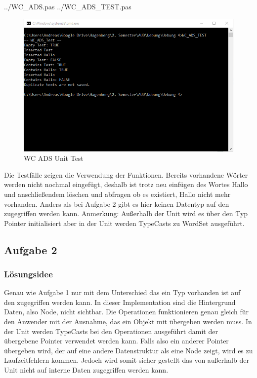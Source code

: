 \documentclass[a4papr,12pt]{article}
\begin{document}
 {../WC_ADS.pas}
 {../WC_ADS_TEST.pas}
\begin{figure}[H]
	\centering
	\includegraphics[scale=0.8]{./pictures/1.png}
	\caption{WC ADS Unit Test }
	\label{fig: WC_ADS Unit}
\end{figure}
\raggedright
Die Testfälle zeigen die Verwendung der Funktionen. Bereits vorhandene Wörter werden nicht nochmal eingefügt, deshalb ist trotz neu einfügen des Wortes \grqq{}Hallo\grqq{} und anschließendem löschen und abfragen ob es existiert, \grqq{}Hallo\grqq{} nicht mehr vorhanden. Anders als bei Aufgabe 2 gibt es hier keinen Datentyp auf den zugegriffen werden kann. Anmerkung: Außerhalb der Unit wird es über den Typ Pointer initialisiert aber in der Unit werden TypeCasts zu WordSet ausgeführt.

\newpage
\subsection*{Aufgabe 2}
\subsubsection*{Lösungsidee}
Genau wie Aufgabe 1 nur mit dem Unterschied das ein Typ vorhanden ist auf den zugegriffen werden kann. In dieser Implementation sind die Hintergrund Daten, also \grqq{}Node\grqq{}, nicht sichtbar. Die Operationen funktionieren genau gleich für den Anwender mit der Ausnahme, das ein Objekt mit übergeben werden muss. In der Unit werden TypeCasts bei den Operationen ausgeführt damit der übergebene Pointer verwendet werden kann. Falls also ein anderer Pointer übergeben wird, der auf eine andere Datenstruktur als eine Node zeigt, wird es zu Laufzeitfehlern kommen. Jedoch wird somit sicher gestellt das von außerhalb der Unit nicht auf interne Daten zugegriffen werden kann.
\newline
\end{document}
